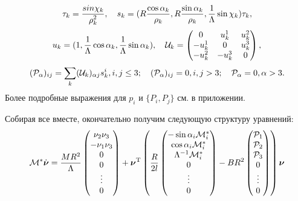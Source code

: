 $$
\tau_k = \displaystyle\frac{\displaystyle sin\chi_k}{\displaystyle \rho_k^2}, \quad s_k = ( R\frac{\cos\alpha_k}{\rho_k}, R\frac{\sin\alpha_k}{\rho_k}, \frac{1}{\Lambda}\sin\chi_k )\tau_k,
$$
$$
u_k = ( 1, \frac{1}{\Lambda}\cos\alpha_k, \frac{1}{\Lambda}\sin\alpha_k ), \quad \mathcal{U}_k = \left(\begin{matrix}
    0      & u_k^1  & u_k^2\\
    -u_k^1 & 0      & u_k^3\\
    -u_k^2 & -u_k^3 & 0    \\
\end{matrix}
\right),
$$
$$
(\mathcal{P}_\alpha)_{ij} = \sum_k (\mathcal{U}_k)_{\alpha j}s^i_k, i,j \leq 3; \quad (\mathcal{P}_\alpha)_{ij} = 0, i,j > 3; \quad \mathcal{P}_\alpha = 0, \alpha > 3. \\
$$
Более подробные выражения для $p_i$ и $\{P_i, P_j\}$ см. в приложении.

Собирая все вместе, окончательно получим следующую структуру уравнений:
\begin{eqnarray}\label{eq:full_system}
\M^*\dot{\vec{\nu}} = 
\frac{MR^2}{\Lambda}\left(\begin{matrix}
    \nu_2\nu_3\\
    -\nu_1\nu_3\\
    0\\
    0\\
    \vdots
    \\
    0
\end{matrix}\right)
+\vec{\nu}^\mathrm{T}\left(
\frac{R}{2l}
\left(\begin{matrix}
    -\sin\alpha_i \M^*_i\\
    \cos\alpha_i \M^*_i\\
    \Lambda^{-1}\M^*_i\\
    0\\
    \vdots
    \\
    0
    \end{matrix}
\right)
-BR^2
\left(\begin{matrix}
    \Prhs_1\\
    \Prhs_2\\
    \Prhs_3\\
    0\\
    \vdots
    \\
    0
\end{matrix}\right)
\right)
\vec{\nu}
\end{eqnarray}

